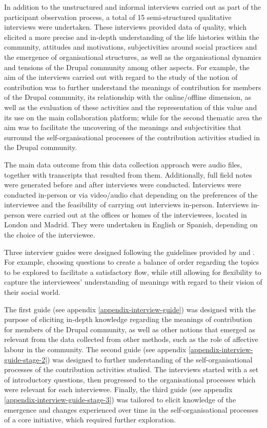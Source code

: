 In addition to the unstructured and informal interviews carried out as part of the participant observation process, a total of 15 semi-structured qualitative interviews were undertaken. These interviews provided data of quality, which elicited a more precise and in-depth understanding of the life histories within the community, attitudes and motivations, subjectivities around social practices and the emergence of organisational structures, as well as the organisational dynamics and tensions of the Drupal community among other aspects. For example, the aim of the interviews carried out with regard to the study of the notion of contribution was to further understand the meanings of contribution for members of the Drupal community, its relationship with the online/offline dimension, as well as the evaluation of these activities and the representation of this value and its use on the main collaboration platform; while for the second thematic area the aim was to facilitate the uncovering of the meanings and subjectivities that surround the self-organisational processes of the contribution activities studied in the Drupal community.

The main data outcome from this data collection approach were audio files, together with transcripts that resulted from them. Additionally, full field notes were generated before and after interviews were conducted. Interviews were conducted in-person or via video/audio chat depending on the preferences of the interviewee and the feasibility of carrying out interviews in-person. Interviews in-person were carried out at the offices or homes of the interviewees, located in London and Madrid. They were undertaken in English or Spanish, depending on the choice of the interviewee.

Three interview guides were designed following the guidelines provided by \textcite{lofland2006analyzing} and \textcite{steinar1996interviews}. For example, choosing questions to create a balance of order regarding the topics to be explored to facilitate a satisfactory flow, while still allowing for flexibility to capture the interviewees' understanding of meanings with regard to their vision of their social world.

The first guide (see appendix \ref{appendix-interview-guide}) was designed with the purpose of eliciting in-depth knowledge regarding the meanings of contribution for members of the Drupal community, as well as other notions that emerged as relevant from the data collected from other methods, such as the role of affective labour in the community. The second guide (see appendix \ref{appendix-interview-guide-stage-2}) was designed to further understanding of the self-organisational processes of the contribution activities studied. The interviews started with a set of introductory questions, then progressed to the organisational processes which were relevant for each interviewee. Finally, the third guide (see appendix \ref{appendix-interview-guide-stage-3}) was tailored to elicit knowledge of the emergence and changes experienced over time in the self-organisational processes of a core initiative, which required further exploration.

